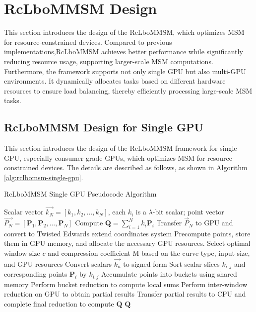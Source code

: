\documentclass[journal=tches,final]{iacrtrans}
\begin{document}
\section{RcLboMMSM Design}
\label{RcLboMMSM Design}
This section introduces the design of the RcLboMMSM, which optimizes MSM for resource-constrained devices. Compared to previous implementations,RcLboMMSM achieves better performance while significantly reducing resource usage, supporting larger-scale MSM computations. Furthermore, the framework supports not only single GPU but also multi-GPU environments. It dynamically allocates tasks based on different hardware resources to ensure load balancing, thereby efficiently processing large-scale MSM tasks.
\subsection{RcLboMMSM Design for Single GPU}
This section introduces the design of the RcLboMMSM framework for single GPU, especially consumer-grade GPUs, which optimizes MSM for resource-constrained devices. The details are described as follows, as shown in Algorithm \ref{alg:rclbomsm-single-gpu}.

\begin{algorithm}
    \caption{RcLboMMSM Single GPU Pseudocode Algorithm}
    \label{alg:rclbomsm-single-gpu}
    \begin{algorithmic}[1]
    \REQUIRE Scalar vector $\overrightarrow{k_N} = [k_1, k_2, \ldots, k_N]$, each $k_i$ is a $\lambda$-bit scalar; point vector $\overrightarrow{P_N} = [\mathbf{P}_1, \mathbf{P}_2, \ldots, \mathbf{P}_N]$
    \ENSURE Compute $\mathbf{Q} = \sum_{i=1}^{N} k_i \mathbf{P}_i$
    \STATE Transfer $\overrightarrow{P}_N$ to GPU and convert to Twisted Edwards extend coordinates system
    \STATE Precompute points, store them in GPU memory, and allocate the necessary GPU resources.
    \STATE Select optimal window size $c$ and compression coefficient M based on the curve type, input size, and GPU resources
    \STATE Convert scalars $\overrightarrow{k_n}$ to signed form 
        \STATE Sort scalar slices $k_{i,j}$ and corresponding points $\mathbf{P}_i$ by $k_{i,j}$
        \STATE Accumulate points into buckets using shared memory 
        \STATE Perform bucket reduction to compute local sums 
    \ENDFOR
    \STATE Perform inter-window reduction on GPU to obtain partial results
    \STATE Transfer partial results to CPU and complete final reduction to compute $\mathbf{Q}$
    \RETURN $\mathbf{Q}$
    \end{algorithmic}
\end{algorithm}
\end{document}
